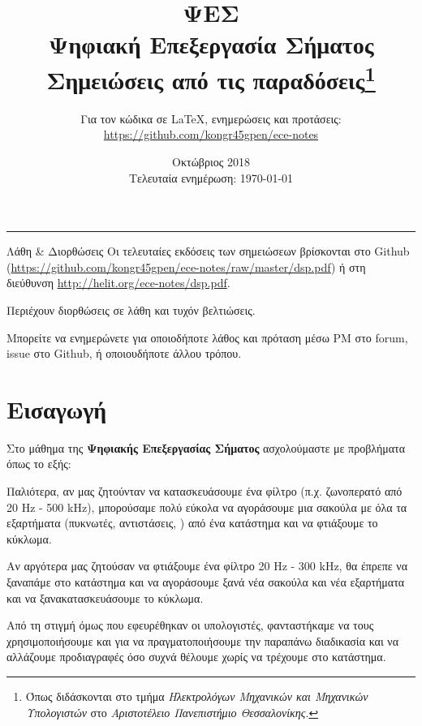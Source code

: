 \documentclass[11pt,a4paper,notitlepage,fleqn]{article}
\title{ΨΕΣ
	\\
	{ 
		\normalsize Ψηφιακή Επεξεργασία Σήματος
		\\
		\normalsize Σημειώσεις από τις παραδόσεις\footnote{Όπως διδάσκονται στο τμήμα \textit{Ηλεκτρολόγων Μηχανικών και Μηχανικών Υπολογιστών} στο \textit{Αριστοτέλειο Πανεπιστήμιο Θεσσαλονίκης}.}
	}}
\date{Οκτώβριος 2018
	\\
	{ 
		\small Τελευταία ενημέρωση: \today
	}
}
\author{
	Για τον κώδικα σε \LaTeX, ενημερώσεις και προτάσεις:
	\\
	\url{https://github.com/kongr45gpen/ece-notes}}
\begin{document}
\maketitle

\hrule
\vspace{50pt}

\begin{infobox}{Λάθη \& Διορθώσεις}
	Οι τελευταίες εκδόσεις των σημειώσεων βρίσκονται στο Github
	(\url{https://github.com/kongr45gpen/ece-notes/raw/master/dsp.pdf}) ή
	στη διεύθυνση \url{http://helit.org/ece-notes/dsp.pdf}.
	
	Περιέχουν διορθώσεις σε λάθη και τυχόν βελτιώσεις.
	
	\tcblower
	
	Μπορείτε να ενημερώνετε για οποιοδήποτε λάθος και πρόταση
	μέσω PM στο forum, issue στο Github, ή οποιουδήποτε άλλου τρόπου.
\end{infobox}

\section{Εισαγωγή}

	
Στο μάθημα της \textbf{Ψηφιακής Επεξεργασίας Σήματος} ασχολούμαστε
με προβλήματα όπως το εξής:

Παλιότερα, αν μας ζητούνταν να κατασκευάσουμε ένα φίλτρο (π.χ.
ζωνοπερατό από 20 Hz - 500 kHz), μπορούσαμε πολύ εύκολα να αγοράσουμε μια σακούλα με
όλα τα εξαρτήματα (πυκνωτές, αντιστάσεις, \textellipsis) από ένα
κατάστημα και να φτιάξουμε το κύκλωμα.

Αν αργότερα μας ζητούσαν να φτιάξουμε ένα φίλτρο 20 Hz - 300 kHz, θα
έπρεπε να ξαναπάμε στο κατάστημα και να αγοράσουμε ξανά νέα σακούλα και νέα εξαρτήματα
και να ξανακατασκευάσουμε το κύκλωμα.

Από τη στιγμή όμως που εφευρέθηκαν οι υπολογιστές, φανταστήκαμε να τους
χρησιμοποιήσουμε και για να πραγματοποιήσουμε την παραπάνω διαδικασία και
να αλλάζουμε προδιαγραφές όσο συχνά θέλουμε χωρίς να τρέχουμε στο κατάστημα.
\end{document}
